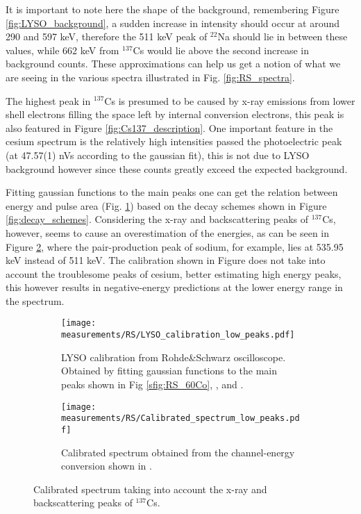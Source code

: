 It is important to note here the shape of the background, remembering Figure \ref{fig:LYSO_background}, a sudden increase in intensity should occur at around 290 and 597 \unit{\kilo\eV}, therefore the 511 \unit{\kilo\eV} peak of $^{22}$Na should lie in between these values, while 662 \unit{\kilo\eV} from $^{137}$Cs would lie above the second increase in background counts. These approximations can help us get a notion of what we are seeing in the various spectra illustrated in Fig. \ref{fig:RS_spectra}.

The highest peak in $^{137}$Cs is presumed to be caused by x-ray emissions from lower shell electrons filling the space left by internal conversion electrons, this peak is also featured in Figure \ref{fig:Cs137_description}. One important feature in the cesium spectrum is the relatively high intensities passed the photoelectric peak (at 47.57(1) nVs according to the gaussian fit), this is not due to LYSO background however since these counts greatly exceed the expected background.

Fitting gaussian functions to the main peaks one can get the relation between energy and pulse area (Fig. \ref{sfig:RS_LYSO_calibration_low_peaks}) based on the decay schemes shown in Figure \ref{fig:decay_schemes}. Considering the x-ray and backscattering peaks of $^{137}$Cs, however, seems to cause an overestimation of the energies, as can be seen in Figure \ref{sfig:RS_LYSO_calibrated_spectrum_low_peaks}, where the pair-production peak of sodium, for example, lies at 535.95 keV instead of 511 keV. The calibration shown in Figure  does not take into account the troublesome peaks of cesium, better estimating high energy peaks, this however results in negative-energy predictions at the lower energy range in the spectrum.

\begin{figure}[H]
  \begin{subfigure}[t]{\textwidth}
    \centering
    \texttt{[image: measurements/RS/LYSO\_calibration\_low\_peaks.pdf]}
    \caption{\label{sfig:RS_LYSO_calibration_low_peaks}LYSO calibration from Rohde\&Schwarz oscilloscope. Obtained by fitting gaussian functions to the main peaks shown in Fig \ref{sfig:RS_60Co}, , and .}
  \end{subfigure}
  \medskip
  \begin{subfigure}[t]{\textwidth}
    \centering
    \texttt{[image: measurements/RS/Calibrated\_spectrum\_low\_peaks.pdf]}
    \caption{\label{sfig:RS_LYSO_calibrated_spectrum_low_peaks}Calibrated spectrum obtained from the channel-energy conversion shown in .}
  \end{subfigure}
  \caption{\label{fig:RS_low_peaks_calibration}Calibrated spectrum taking into account the x-ray and backscattering peaks of $^{137}$Cs.}
\end{figure}

